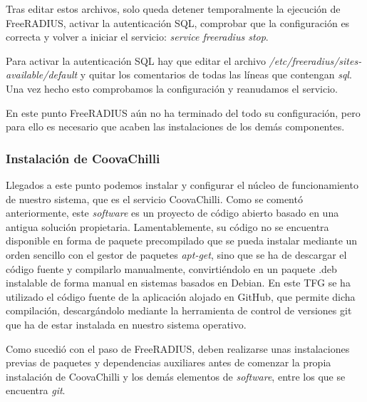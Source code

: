Tras editar estos archivos, solo queda detener temporalmente la ejecución de FreeRADIUS, activar la autenticación SQL, comprobar que la configuración es correcta y volver a iniciar el servicio: \emph{service freeradius stop}.

Para activar la autenticación SQL hay que editar el archivo \emph{/etc/freeradius/sites-available/default} y quitar los comentarios de todas las líneas que contengan \emph{sql}. Una vez hecho esto comprobamos la configuración y reanudamos el servicio.


En este punto FreeRADIUS aún no ha terminado del todo su configuración, pero para ello es necesario que acaben las instalaciones de los demás componentes.

\subsubsection{Instalación de CoovaChilli} \label{CoovaInstall}

Llegados a este punto podemos instalar y configurar el núcleo de funcionamiento de nuestro sistema, que es el servicio CoovaChilli. Como se comentó anteriormente, este \emph{software} es un proyecto de código abierto basado en una antigua solución propietaria. Lamentablemente, su código no se encuentra disponible en forma de paquete precompilado que se pueda instalar mediante un orden sencillo con el gestor de paquetes \emph{apt-get}, sino que se ha de descargar el código fuente y compilarlo manualmente, convirtiéndolo en un paquete .deb instalable de forma manual en sistemas basados en Debian. En este TFG se ha utilizado el código fuente de la aplicación alojado en GitHub, que permite dicha compilación, descargándolo mediante la herramienta de control de versiones git que ha de estar instalada en nuestro sistema operativo.

Como sucedió con el paso de FreeRADIUS, deben realizarse unas instalaciones previas de paquetes y dependencias auxiliares antes de comenzar la propia instalación de CoovaChilli y los demás elementos de \emph{software}, entre los que se encuentra \emph{git}.

